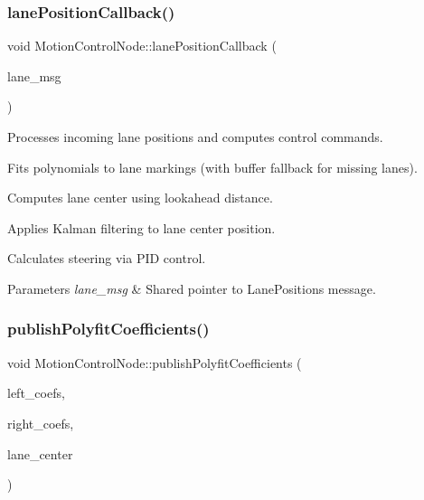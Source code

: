 \subsubsection{\texorpdfstring{lane\+Position\+Callback()}{lanePositionCallback()}}
{\footnotesize\ttfamily void Motion\+Control\+Node\+::lane\+Position\+Callback (\begin{DoxyParamCaption}\item[{lane\+\_\+msgs\+::msg\+::\+Lane\+Positions\+::\+Shared\+Ptr}]{lane\+\_\+msg }\end{DoxyParamCaption})\hspace{0.3cm}{\ttfamily [private]}}



Processes incoming lane positions and computes control commands. 


\begin{DoxyItemize}
\item Fits polynomials to lane markings (with buffer fallback for missing lanes).
\item Computes lane center using lookahead distance.
\item Applies Kalman filtering to lane center position.
\item Calculates steering via P\+ID control.
\end{DoxyItemize}


\begin{DoxyParams}{Parameters}
{\em lane\+\_\+msg} & Shared pointer to Lane\+Positions message. \\
\hline
\end{DoxyParams}
\mbox{\label{classMotionControlNode_a2f890913a81fdb965348897dbd972a77}} 
\subsubsection{\texorpdfstring{publish\+Polyfit\+Coefficients()}{publishPolyfitCoefficients()}}
{\footnotesize\ttfamily void Motion\+Control\+Node\+::publish\+Polyfit\+Coefficients (\begin{DoxyParamCaption}\item[{const std\+::vector$<$ double $>$ \&}]{left\+\_\+coefs,  }\item[{const std\+::vector$<$ double $>$ \&}]{right\+\_\+coefs,  }\item[{Point32 \&}]{lane\+\_\+center }\end{DoxyParamCaption})\hspace{0.3cm}{\ttfamily [private]}}



